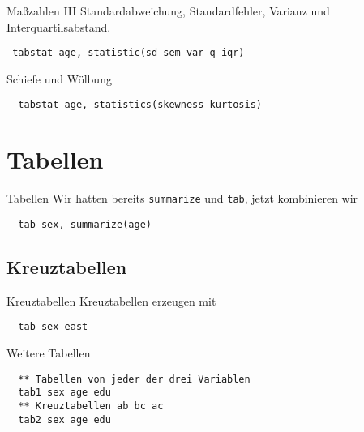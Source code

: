 \begin{frame}[fragile]{Maßzahlen III}
Standardabweichung, Standardfehler, Varianz und Interquartilsabstand.              
\begin{lstlisting}
 tabstat age, statistic(sd sem var q iqr)
\end{lstlisting}
Schiefe und Wölbung
\begin{lstlisting}
  tabstat age, statistics(skewness kurtosis)
\end{lstlisting}

\end{frame}

\section{Tabellen}
\begin{frame}[fragile]{Tabellen}   
Wir hatten bereits \texttt{summarize} und \texttt{tab}, jetzt kombinieren wir
\begin{lstlisting}
  tab sex, summarize(age)
\end{lstlisting}
\end{frame}

\subsection{Kreuztabellen}
\begin{frame}[fragile]{Kreuztabellen}    
Kreuztabellen erzeugen mit
\begin{lstlisting}
  tab sex east
\end{lstlisting}
Weitere Tabellen
\begin{lstlisting}
  ** Tabellen von jeder der drei Variablen
  tab1 sex age edu
  ** Kreuztabellen ab bc ac
  tab2 sex age edu
\end{lstlisting}
\end{frame}

